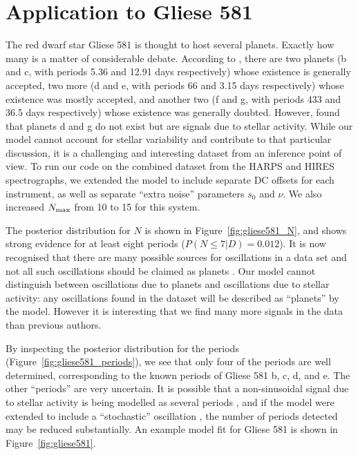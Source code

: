 \documentclass[useAMS,usenatbib]{mn2e}
\begin{document}
\section{Application to Gliese 581}
The red dwarf star Gliese 581 is thought to host several planets. Exactly
how many is a matter of considerable debate. According to
\citet{2014Sci...345..440R}, there are two planets
(b and c, with periods 5.36 and 12.91 days respectively)
whose existence is generally
accepted, two more
(d and e, with periods 66 and 3.15 days respectively)
whose existence was mostly accepted, and another two
(f and g, with periods 433 and 36.5 days respectively)
whose existence was generally doubted. However, \citet{2014Sci...345..440R}
found that planets d and g do not exist but are signals due to stellar activity.
While our model cannot account for stellar variability and contribute to that
particular discussion, it is a challenging and interesting dataset from an
inference point of view.
To run our code on the combined dataset from the HARPS and HIRES spectrographs,
we extended the model to include separate DC offsets for each instrument, as
well as separate ``extra noise'' parameters $s_0$ and $\nu$. We also increased
$N_{\rm max}$ from 10 to 15 for this system.

The posterior distribution for $N$ is shown in Figure~\ref{fig:gliese581_N},
and shows strong evidence for at least eight periods
($P(N \leq 7 | D) = 0.012$).
It is now recognised that
there are many possible sources for oscillations in a data set and not all
such oscillations should be claimed as planets \citep{2014Sci...345..440R}. 
Our model cannot distinguish between oscillations due to planets and
oscillations due to stellar activity: any oscillations found in the dataset
will be described as ``planets'' by the model. However it is interesting that
we find many more signals in the data than previous authors.

By inspecting the posterior distribution for the periods
(Figure~\ref{fig:gliese581_periods}), we see that only four of the periods
are well determined, corresponding to the known periods of Gliese 581 b, c, d,
and e. The other ``periods'' are very uncertain. It is possible that a
non-sinusoidal signal due to stellar activity is being modelled as several
periods \citep{astero}, and if the model were extended to include a ``stochastic''
oscillation \citep{gaussproc}, the number of periods detected may be reduced
substantially. An example model fit for Gliese 581 is shown in
Figure~\ref{fig:gliese581}.
\end{document}
